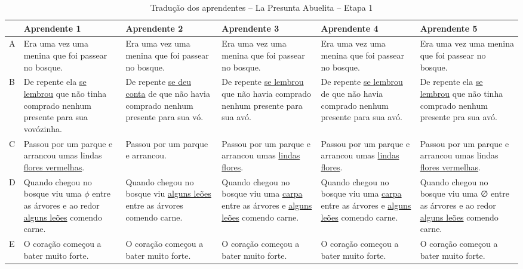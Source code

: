 \documentclass[portuguese]{textolivre}
\begin{document}
\begin{small}
\begin{longtable}{l *{5}{>{\raggedright\arraybackslash}p{2.4cm}}}
\caption{Tradução dos aprendentes – La Presunta Abuelita – Etapa 1\label{quadro2}} \\
\arrayrulecolor{black}
\toprule 
 & Aprendente 1 & Aprendente 2 & Aprendente 3 & 
 Aprendente 4 & Aprendente 5 \\
\midrule
\endfirsthead

\arrayrulecolor{lightgray}
A & Era uma vez uma menina que foi passear no bosque. & Era uma vez uma menina que foi passear no bosque. & Era uma vez uma menina que foi passear no bosque. & Era uma vez uma menina que foi passear no bosque. & Era uma vez uma menina que foi passear no bosque. \\
\hline
B & De repente ela \underline{se lembrou} que não tinha comprado ne\-nhum presente para sua vovózinha. & De repente \underline{se deu conta} de que não havia comprado ne\-nhum presente para sua vó. & De repente \underline{se lembrou} que não havia comprado ne\-nhum presente para sua avó. & De repente \underline{se lembrou} de que não havia comprado ne\-nhum presente para sua avó. & De repente ela \underline{se lembrou} que não tinha comprado ne\-nhum presente pra sua avó. \\
\hline
C & Passou por um parque e arrancou umas lindas \underline{flores vermelhas}. & Passou por um parque e arrancou. & Passou por um parque e arrancou umas \underline{lindas flores}. & Passou por um parque e arrancou umas \underline{lindas flores}. & Passou por um parque e arrancou umas lindas \underline{flores vermelhas}. \\
\hline
D & Quando chegou no bosque viu uma $\phi$ entre as árvores e ao redor \underline{alguns leões} comendo carne. & Quando chegou no bosque viu \underline{alguns leões} entre as árvores comendo carne. & Quando chegou no bosque viu uma \underline{carpa} entre as árvores e \underline{alguns leões} comendo carne. & Quando chegou no bosque viu uma \underline{carpa} entre as árvores e \underline{alguns leões} comendo carne. & Quando chegou no bosque viu uma ∅ entre as árvores e ao redor \underline{alguns leões} comendo carne. \\
\hline
E & O coração começou a bater muito forte. & O coração começou a bater muito forte. & O coração começou a bater muito forte. & O coração começou a bater muito forte. & O coração começou a bater muito forte. \\
\hline

\end{longtable}
\end{small}
\end{document}

